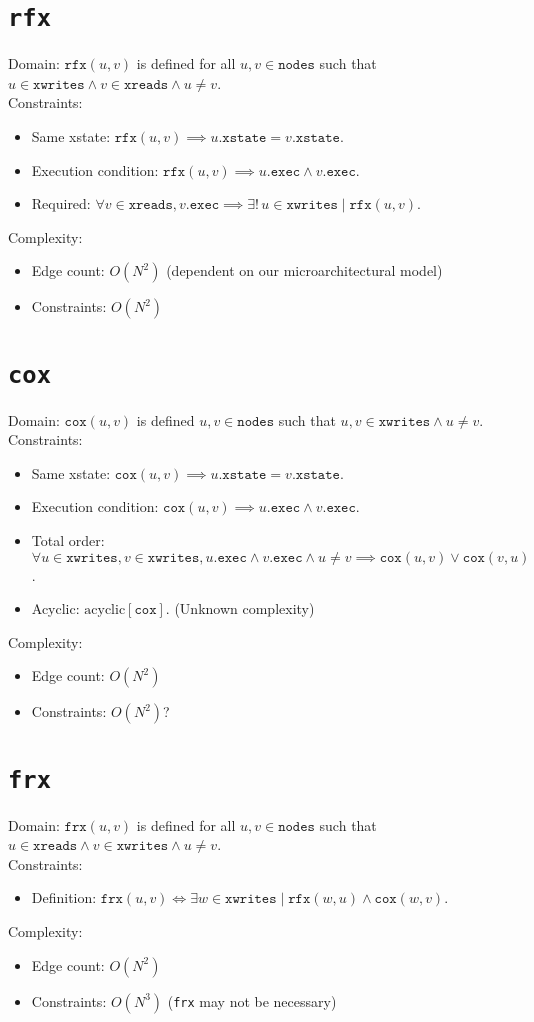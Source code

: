 \documentclass{article}
\newcommand{\nodes}{\texttt{nodes}}
\newcommand{\exec}{\texttt{exec}}
\newcommand{\rfx}{\texttt{rfx}}
\newcommand{\cox}{\texttt{cox}}
\newcommand{\frx}{\texttt{frx}}
\newcommand{\xwrites}{\texttt{xwrites}}
\newcommand{\xreads}{\texttt{xreads}}
\newcommand{\xstate}{\texttt{xstate}}
\begin{document}
\section{\rfx}
Domain: $\rfx(u,v)$ is defined for all $u,v \in \nodes$ such that $u \in \xwrites \wedge v \in \xreads \wedge u \neq v$.
\\
Constraints:
\begin{itemize}
\item Same xstate: $\rfx(u,v) \implies u.\xstate = v.\xstate$.
\item Execution condition: $\rfx(u,v) \implies u.\exec \wedge v.\exec$.
\item Required: $\forall v \in \xreads, v.\exec \implies \exists!\,u \in \xwrites \mid
  \rfx(u,v)$.
\end{itemize}
Complexity:
\begin{itemize}
\item Edge count: $O(N^2)$ (dependent on our microarchitectural model)
\item Constraints: $O(N^2)$
\end{itemize}


\section{\cox}
Domain: $\cox(u,v)$ is defined $u,v \in \nodes$ such that
$u,v \in \xwrites \wedge u \neq v$.
\\
Constraints:
\begin{itemize}
\item Same xstate: $\cox(u,v) \implies u.\xstate = v.\xstate$.
\item Execution condition: $\cox(u,v) \implies u.\exec \wedge v.\exec$.
\item Total order: $\forall u \in \xwrites, v \in \xwrites, u.\exec \wedge v.\exec \wedge u \neq v \implies \cox(u,v) \vee \cox(v,u)$.
\item Acyclic: $\text{acyclic}[\cox]$. (Unknown complexity)
\end{itemize}
Complexity:
\begin{itemize}
\item Edge count: $O(N^2)$
\item Constraints: $O(N^2)$?
\end{itemize}

\section{\frx}
Domain: $\frx(u,v)$ is defined for all $u,v \in \nodes$ such that $u \in \xreads \wedge v \in \xwrites \wedge u \neq v$.
\\
Constraints:
\begin{itemize}
\item Definition: $\frx(u,v) \iff \exists w \in \xwrites \mid
  \rfx(w,u) \wedge \cox(w,v)$.
\end{itemize}
Complexity:
\begin{itemize}
\item Edge count: $O(N^2)$
\item Constraints: $O(N^3)$ (\frx{} may not be necessary) 
\end{itemize}
\end{document}
